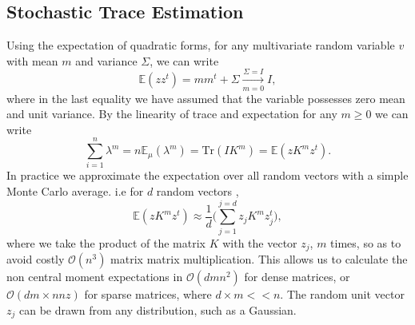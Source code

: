 \documentclass[letterpaper]{article} %
\begin{document}
\subsection{Stochastic Trace Estimation}
Using the expectation of quadratic forms, for any multivariate random variable $v$ with mean $m$ and variance $\Sigma$, we can write 
\begin{equation}
\mathbb{E}(zz^{t}) = mm^{t}+\Sigma \xrightarrow[m = 0]{\Sigma = I} I,
\end{equation}
where in the last equality we have assumed that the variable possesses zero mean and unit variance. By the linearity of trace and expectation for any $m\geq 0$ we can write
\begin{equation}
\sum_{i=1}^{n}\lambda^{m} = n\mathbb{E}_{\mu}(\lambda^{m}) = \text{Tr}(IK^{m}) = \mathbb{E}(zK^{m}z^{t}).
\end{equation}
In practice we approximate the expectation over all random vectors with a simple Monte Carlo average. i.e for $d$ random vectors ,
\begin{equation}
\mathbb{E}(zK^{m}z^{t}) \approx \frac{1}{d}\bigg(\sum_{j=1}^{j=d}z_{j}K^{m}z_{j}^{t} \bigg),
\end{equation}
where we take the product of the matrix $K$ with the vector $z_{j}$, $m$ times, so as to avoid costly $\mathcal{O}(n^{3})$ matrix matrix multiplication. This allows us to calculate the non central moment expectations in $\mathcal{O}(dmn^{2})$ for dense matrices, or $\mathcal{O}(dm\times nnz)$ for sparse matrices, where $d\times m << n$. The random unit vector $z_{j}$ can be drawn from any distribution, such as a Gaussian. 






\end{document}
